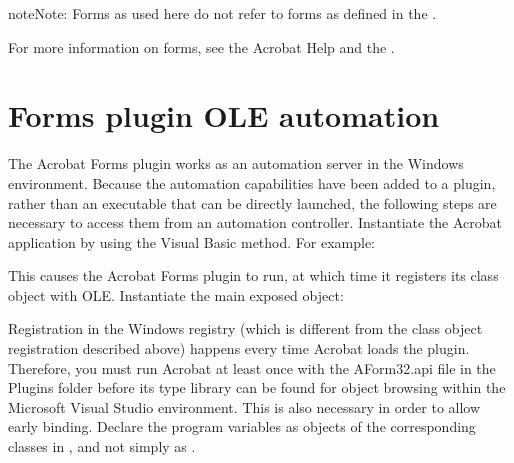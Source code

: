 \documentclass[letterpaper,12pt,english,openany,oneside]{sphinxmanual}
\begin{document}
\begin{sphinxadmonition}{note}{Note:}
Forms as used here do not refer to  forms as defined in the  .
\end{sphinxadmonition}

For more information on forms, see the Acrobat Help and the  .


\section{Forms plug\sphinxhyphen{}in OLE automation}
\label{\detokenize{IAC_API_FormsIntro:forms-plug-in-ole-automation}}
The Acrobat Forms plug\sphinxhyphen{}in works as an automation server in the Windows environment. Because the automation capabilities have been added to a plug\sphinxhyphen{}in, rather than an executable that can be directly launched, the following steps are necessary to access them from an automation controller. Instantiate the Acrobat application by using the Visual Basic  method. For example:

\begin{sphinxVerbatim}[commandchars=\\\{\}]
\end{sphinxVerbatim}

This causes the Acrobat Forms plug\sphinxhyphen{}in to run, at which time it registers its class object with OLE. Instantiate the main exposed object:

\begin{sphinxVerbatim}[commandchars=\\\{\}]
\end{sphinxVerbatim}

Registration in the Windows registry (which is different from the class object registration described above) happens every time Acrobat loads the plug\sphinxhyphen{}in. Therefore, you must run Acrobat at least once with the AForm32.api file in the Plugins folder before its type library can be found for object browsing within the Microsoft Visual Studio environment. This is also necessary in order to allow early binding. Declare the program variables as objects of the corresponding classes in , and not simply as .
\end{document}
